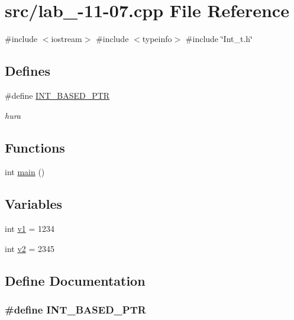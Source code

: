\hypertarget{lab__2012-11-07_8cpp}{\section{src/lab\-\_-\/11-\/07.cpp \-File \-Reference}
\label{lab__2012-11-07_8cpp}
}
{\ttfamily \#include $<$iostream$>$}\*
{\ttfamily \#include $<$typeinfo$>$}\*
{\ttfamily \#include \char`\"{}\-Int\-\_\-t.\-h\char`\"{}}\*
\subsection*{\-Defines}
\begin{DoxyCompactItemize}
\item 
\#define \hyperlink{lab__2012-11-07_8cpp_a26a95ee06b3c1c2d31618cc2d1fc49e8}{\-I\-N\-T\-\_\-\-B\-A\-S\-E\-D\-\_\-\-P\-T\-R}
\begin{DoxyCompactList}\small\item\em hura \end{DoxyCompactList}\end{DoxyCompactItemize}
\subsection*{\-Functions}
\begin{DoxyCompactItemize}
\item 
int \hyperlink{lab__2012-11-07_8cpp_ae66f6b31b5ad750f1fe042a706a4e3d4}{main} ()
\end{DoxyCompactItemize}
\subsection*{\-Variables}
\begin{DoxyCompactItemize}
\item 
int \hyperlink{lab__2012-11-07_8cpp_ac3f9ff4294615df8b7e9684b7d6fddc7}{v1} = 1234
\item 
int \hyperlink{lab__2012-11-07_8cpp_aa517e2fff4a8c9cba11391ca12f91803}{v2} = 2345
\end{DoxyCompactItemize}


\subsection{\-Define \-Documentation}
\hypertarget{lab__2012-11-07_8cpp_a26a95ee06b3c1c2d31618cc2d1fc49e8}{
\subsubsection[{\-I\-N\-T\-\_\-\-B\-A\-S\-E\-D\-\_\-\-P\-T\-R}]{\setlength{\rightskip}{0pt plus 5cm}\#define {\bf \-I\-N\-T\-\_\-\-B\-A\-S\-E\-D\-\_\-\-P\-T\-R}}}\label{lab__2012-11-07_8cpp_a26a95ee06b3c1c2d31618cc2d1fc49e8}


